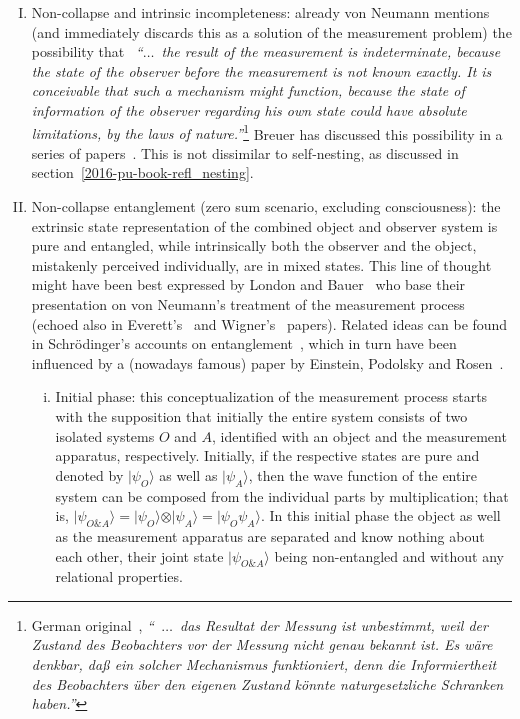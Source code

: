\begin{enumerate}[(I)]
\item
Non-collapse and intrinsic incompleteness: already von Neumann mentions
(and immediately discards this as a solution of the measurement problem)
the possibility  that~\cite[Section~VI.2, p~426]{v-neumann-55}
{\em ``$\ldots$~the result of the measurement
is indeterminate, because the state of the observer before
the measurement is not known exactly. It is conceivable
that such a mechanism might function, because the state of
information of the observer regarding his own state could
have absolute limitations, by the laws of nature.''}\footnote{
German original~\cite[Section~VI.3, p~233]{v-neumann-55},
{\em ``~$\ldots$~das Resultat
der Messung ist unbestimmt, weil der Zustand des Beobachters vor
der Messung nicht genau bekannt ist. Es w\"are denkbar, da\ss{} ein solcher
Mechanismus funktioniert, denn die Informiertheit des Beobachters
\"uber den eigenen Zustand k\"onnte naturgesetzliche Schranken haben.''}}
Breuer has discussed this possibility in a series of papers~\cite{Breuer1995,Breuer1996,Breuer1999}.
This is not dissimilar to self-nesting, as discussed in section~\ref{2016-pu-book-refl_nesting}.



\item
Non-collapse entanglement (zero sum scenario, excluding consciousness): the extrinsic state representation of the combined object and observer system is pure and entangled,
while intrinsically both the observer and   the
object, mistakenly perceived individually, are in mixed states.
This line of thought might have been best expressed by London and Bauer~\cite{london-Bauer-1939,london-Bauer-1983}
who base their presentation on von Neumann's treatment of the measurement process~\cite[Chapter~VI]{v-neumann-49}
(echoed also in Everett's~\cite{everett} and Wigner's~\cite{wigner:mb} papers).
Related ideas can be found in Schr\"odinger's accounts on entanglement~\cite{schrodinger,CambridgeJournals:1737068,CambridgeJournals:2027212},
which in turn have been influenced by a (nowadays famous) paper by Einstein, Podolsky and  Rosen~\cite{epr}.


\begin{enumerate}[(i)]
\item
Initial phase: this conceptualization of the measurement process starts with the supposition that initially the entire system consists
of two isolated systems $O$ and $A$, identified with an object and the measurement apparatus, respectively.
Initially, if the respective states are pure and denoted by
$\vert \psi_O\rangle$ as well as
$\vert \psi_A\rangle$,
then  the wave function  of the entire system can be composed from the individual parts by  multiplication;
that is,
$\vert \psi_{O\& A} \rangle = \vert \psi_O\rangle \otimes \vert \psi_A\rangle = \vert \psi_O \psi_A\rangle$.
In this initial phase  the object as well as the measurement apparatus are separated and know nothing about each other,
their joint state $\vert \psi_{O\& A} \rangle$ being non-entangled and without any relational properties.


\end{enumerate}
\end{enumerate}
